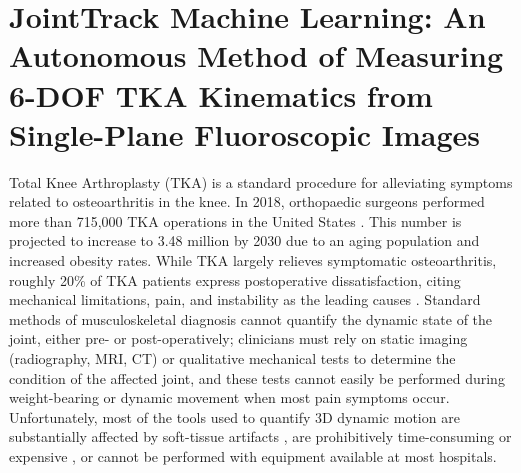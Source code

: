 \chapter{JointTrack Machine Learning: An Autonomous Method of Measuring 6-DOF TKA Kinematics from Single-Plane Fluoroscopic Images}
\label{sec:jtml}
Total Knee Arthroplasty (TKA) is a standard procedure for alleviating symptoms related to osteoarthritis in the knee.
In 2018, orthopaedic surgeons performed more than 715,000 TKA operations in the United States \cite{agencyforhealthcareresearchandqualityHCUPFastStats}.
This number is projected to increase to 3.48 million by 2030 \cite{kurtzProjectionsPrimaryRevision2007} due to an aging population and increased obesity rates.
While TKA largely relieves symptomatic osteoarthritis, roughly 20\% of TKA patients express postoperative dissatisfaction, citing mechanical limitations, pain, and instability as the leading causes \cite{bakerRolePainFunction2007,bournePatientSatisfactionTotal2010,scottPredictingDissatisfactionFollowing2010}.
Standard methods of musculoskeletal diagnosis cannot quantify the dynamic state of the joint, either pre- or post-operatively; clinicians must rely on static imaging (radiography, MRI, CT) or qualitative mechanical tests to determine the condition of the affected joint, and these tests cannot easily be performed during weight-bearing or dynamic movement when most pain symptoms occur.
Unfortunately, most of the tools used to quantify 3D dynamic motion are substantially affected by soft-tissue artifacts \cite{gaoInvestigationSoftTissue2008,stagniQuantificationSoftTissue2005,linEffectsSoftTissue2016}, are prohibitively time-consuming or expensive \cite{daemsValidationThreedimensionalTotal2016}, or cannot be performed with equipment available at most hospitals.

